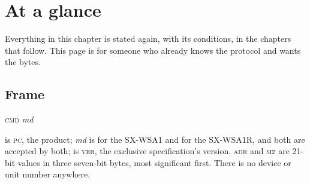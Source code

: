 \chapter{At a glance}\label{ch:glance}

Everything in this chapter is stated again, with its conditions, in the chapters that
follow. This page is for someone who already knows the protocol and wants the bytes.

\section{Frame}
\begin{center}
 \quad {} \quad \textsc{cmd} \quad {} \quad \textit{md} \quad
{}  \quad {}
\end{center}

 is \textsc{pc}, the product; \textit{md} is  for the SX-WSA1 and
 for the SX-WSA1R, and both are accepted by both;  is \textsc{ver}, the
exclusive specification's version. \textsc{adr} and \textsc{siz} are 21-bit values in three
seven-bit bytes, most significant first. There is no device or unit number anywhere.

